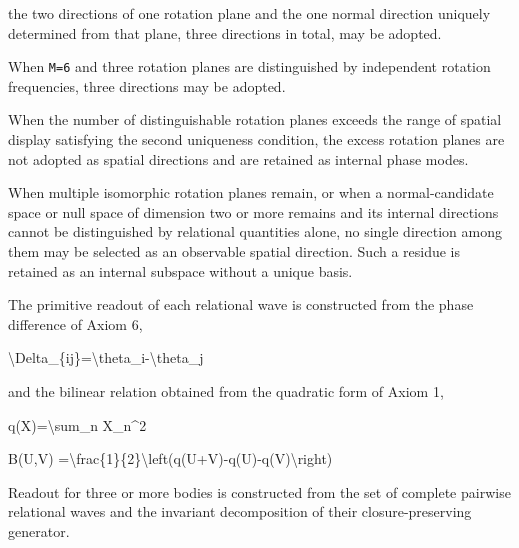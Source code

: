 \documentclass[
  a4paper,
]{article}
\newenvironment{Shaded}{}{}
\newcommand{\NormalTok}[1]{#1}
\begin{document}
the two directions of one rotation plane and the one normal direction
uniquely determined from that plane, three directions in total, may be
adopted.

When \texttt{M=6} and three rotation planes are distinguished by
independent rotation frequencies, three directions may be adopted.

When the number of distinguishable rotation planes exceeds the range of
spatial display satisfying the second uniqueness condition, the excess
rotation planes are not adopted as spatial directions and are retained
as internal phase modes.

When multiple isomorphic rotation planes remain, or when a
normal-candidate space or null space of dimension two or more remains
and its internal directions cannot be distinguished by relational
quantities alone, no single direction among them may be selected as an
observable spatial direction. Such a residue is retained as an internal
subspace without a unique basis.

The primitive readout of each relational wave is constructed from the
phase difference of Axiom 6,

\begin{Shaded}
\begin{Highlighting}[]
\NormalTok{\textbackslash{}Delta\_\{ij\}=\textbackslash{}theta\_i{-}\textbackslash{}theta\_j}
\end{Highlighting}
\end{Shaded}

and the bilinear relation obtained from the quadratic form of Axiom 1,

\begin{Shaded}
\begin{Highlighting}[]
\NormalTok{q(X)=\textbackslash{}sum\_n X\_n\^{}2}
\end{Highlighting}
\end{Shaded}

\begin{Shaded}
\begin{Highlighting}[]
\NormalTok{B(U,V)}
\NormalTok{=\textbackslash{}frac\{1\}\{2\}\textbackslash{}left(q(U+V){-}q(U){-}q(V)\textbackslash{}right)}
\end{Highlighting}
\end{Shaded}

Readout for three or more bodies is constructed from the set of complete
pairwise relational waves and the invariant decomposition of their
closure-preserving generator.
\end{document}
